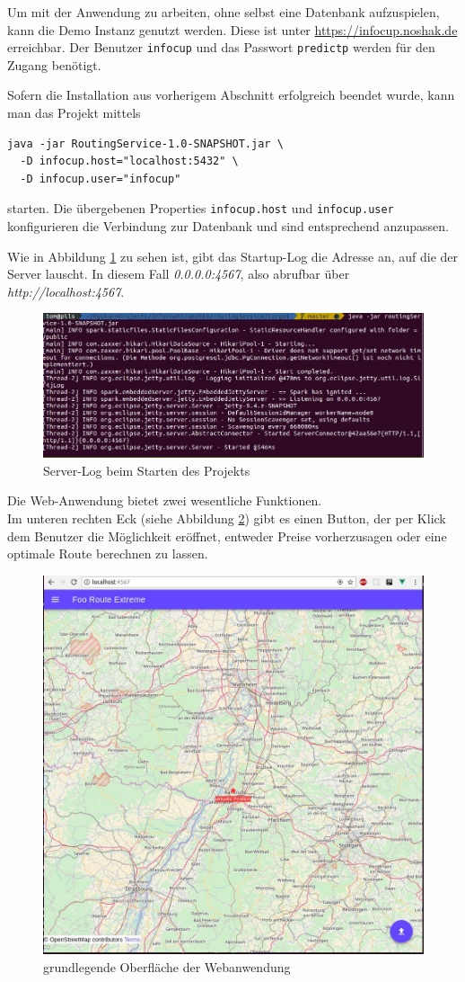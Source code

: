 \documentclass[
ngerman          %
,a4paper          %
,11pt
,pdftex
]{report}
\begin{document}
Um mit der Anwendung zu arbeiten, ohne selbst eine Datenbank aufzuspielen, kann die Demo Instanz genutzt werden. Diese ist unter \url{https://infocup.noshak.de} erreichbar. Der Benutzer \texttt{infocup} und das Passwort \texttt{predictp} werden für den Zugang benötigt.

Sofern die Installation aus vorherigem Abschnitt erfolgreich beendet wurde, kann man das Projekt mittels
\begin{lstlisting}
java -jar RoutingService-1.0-SNAPSHOT.jar \
  -D infocup.host="localhost:5432" \
  -D infocup.user="infocup"
\end{lstlisting}
starten.
Die übergebenen Properties \texttt{infocup.host} und \texttt{infocup.user} konfigurieren die Verbindung zur Datenbank und sind entsprechend anzupassen.

Wie in Abbildung \ref{fig:install1} zu sehen ist, gibt das Startup-Log die Adresse an, auf die der Server lauscht. In diesem Fall {\em 0.0.0.0:4567}, also abrufbar über {\em http://localhost:4567}.
\begin{figure}[H]
\centering
\includegraphics[width=1\linewidth]{install1.jpg}
\caption{Server-Log beim Starten des Projekts}
\label{fig:install1}
\end{figure}
Die Web-Anwendung bietet zwei wesentliche Funktionen.\\
Im unteren rechten Eck (siehe Abbildung \ref{fig:install2}) gibt es einen Button, der per Klick dem Benutzer die Möglichkeit eröffnet, entweder Preise vorherzusagen oder eine optimale Route berechnen zu lassen.
\begin{figure}[H]
\centering
\includegraphics[width=0.6\linewidth]{install2.jpg}
\caption{grundlegende Oberfläche der Webanwendung}
\label{fig:install2}
\end{figure}
\clearpage
\end{document}
